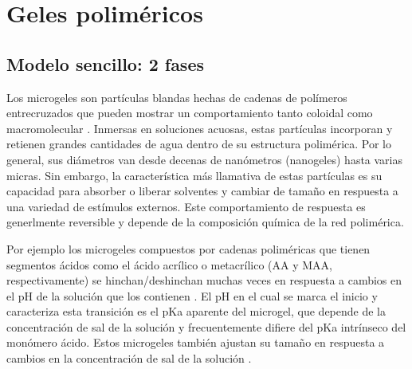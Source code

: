 
\chapter{Geles polim\'ericos} %

\label{Chapter3} %


\newcommand{\keyword}[1]{\textbf{#1}}
\newcommand{\tabhead}[1]{\textbf{#1}}
\newcommand{\code}[1]{\texttt{#1}}
\newcommand{\file}[1]{\texttt{\bfseries#1}}
\newcommand{\option}[1]{\texttt{\itshape#1}}


\section{Modelo sencillo: 2 fases}

Los microgeles son part\'iculas blandas hechas de cadenas de pol\'imeros entrecruzados que pueden mostrar un comportamiento tanto coloidal como macromolecular \cite{plamper2017functional}.
Inmersas en soluciones acuosas, estas part\'iculas incorporan y retienen grandes cantidades de agua dentro de su estructura polim\'erica.
Por lo general, sus di\'ametros van desde decenas de nan\'ometros (nanogeles) hasta varias micras.
Sin embargo, la caracter\'istica m\'as llamativa de estas part\'iculas es su capacidad para absorber o liberar solventes y cambiar de tama\~no en respuesta a una variedad de est\'imulos externos.
Este comportamiento de respuesta es  generlmente reversible y depende de la composici\'on qu\'imica de la red polim\'erica.


Por ejemplo los microgeles compuestos por cadenas polim\'ericas que tienen segmentos \'acidos como el \'acido acr\'ilico o metacr\'ilico (AA y MAA, respectivamente) se hinchan/deshinchan muchas veces en respuesta a cambios en el pH de la soluci\'on que los contienen \cite{snowden1996colloidal}.
El pH en el cual se marca el inicio y caracteriza esta transici\'on es el pKa aparente del microgel, que depende de la concentraci\'on de sal de la soluci\'on y frecuentemente difiere del pKa intrínseco del mon\'omero \'acido.
Estos microgeles tambi\'en ajustan su tama\~no en respuesta a cambios en la concentraci\'on de sal de la soluci\'on \cite{snowden1996colloidal}.

